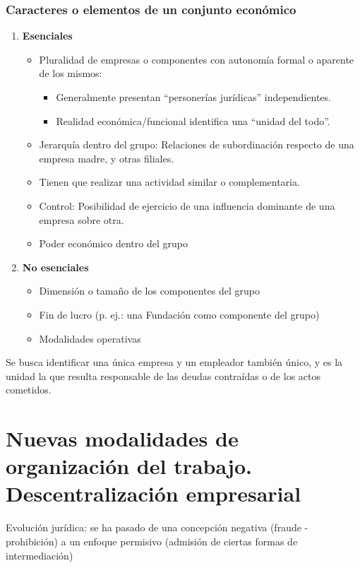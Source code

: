 \documentclass[spanish,12pt,a4paper,titlepage]{report}
\begin{document}
\subsubsection{Caracteres o elementos de un conjunto económico}
\begin{enumerate}
	\item \textbf{Esenciales}
		\begin{itemize}
		\item Pluralidad de empresas o componentes con autonomía formal o aparente de los mismos:
                  \begin{itemize}
                  \item Generalmente presentan “personerías jurídicas” independientes.
                  \item Realidad económica/funcional identifica una “unidad del todo”.
                  \end{itemize}
		\item Jerarquía dentro del grupo: Relaciones de subordinación respecto de una empresa madre, y otras filiales.
		\item Tienen que realizar una actividad similar o complementaria.
		\item Control: Posibilidad de ejercicio de una influencia dominante de una empresa sobre otra.
		\item Poder económico dentro del grupo
		\end{itemize}
	\item \textbf{No esenciales}
	\begin{itemize}
		\item Dimensión o tamaño de los componentes del grupo
		\item Fin de lucro (p. ej.: una Fundación como componente del grupo)
		\item Modalidades operativas
	\end{itemize}	
\end{enumerate}

Se busca identificar una única empresa y un empleador también único, y es la unidad la que resulta responsable de las deudas contraídas o de los actos cometidos.

\section{Nuevas modalidades de organización del trabajo. Descentralización empresarial}

Evolución jurídica: se ha pasado de una concepción negativa (fraude - prohibición) a un enfoque permisivo (admisión de ciertas formas de intermediación)
\end{document}
